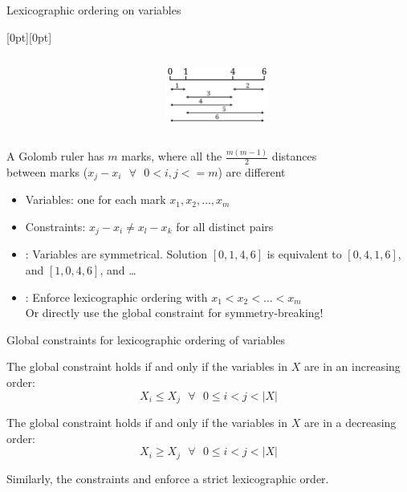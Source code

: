 \documentclass{cons-beamer}
\begin{document}
\begin{frame}{Lexicographic ordering on variables}
  \begin{example}
    \raisebox{-\height}[0pt][0pt]{%
      \begin{columns}
        \begin{column}{0.65\textwidth}
            
        \end{column}
        \begin{column}{0.2\textwidth}
          \includegraphics[height=18mm]{images/Golomb_Ruler-4.png}%
        \end{column}
      \end{columns}
    }

    A Golomb ruler has \(m\) marks, where all the \(\frac{m(m-1)}{2}\) distances \\ between marks (\(x_j - x_i \text{ } \forall \text{ } 0 < i,j <= m\)) are different
    \vfill

    \begin{itemize}
      \item Variables: one for each mark \(x_1, x_2, \ldots, x_m\)
      \item Constraints: \(x_j - x_i \neq x_l - x_k\) for all distinct pairs
        \vfill
      \item {}: Variables are symmetrical. Solution $[0,1,4,6]$ is equivalent to $[0,4,1,6]$, and $[1,0,4,6]$, and \dots
        \vfill
      \item {}: Enforce lexicographic ordering with 
        \(x_1 < x_2 < \ldots < x_m\)
         \\ [+5pt]
        Or directly use the  global constraint for symmetry-breaking!
    \end{itemize}
  \end{example}
\end{frame}

\begin{frame}{Global constraints for lexicographic ordering of variables}
  \begin{definition}
    The  global constraint holds if and only if the variables in $X$ are in an increasing order: 
    $$X_i \leq X_j \text{ } \forall \text{ } 0 \leq i < j < |X|$$
  \end{definition}
  \vfill

  \begin{definition}
    The  global constraint holds if and only if the variables in $X$ are in a decreasing order:
    $$X_i \geq X_j \text{ } \forall \text{ } 0 \leq i < j < |X|$$
  \end{definition}
  \vfill

  Similarly, the constraints  and  enforce a strict lexicographic order.
\end{frame}
\end{document}
